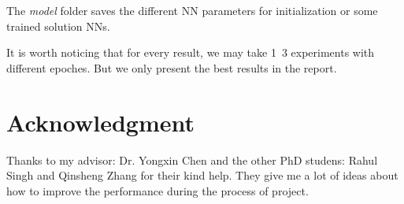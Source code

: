 \documentclass[conference,compsoc]{IEEEtran}
\begin{document}
The \textit{model} folder saves the different NN parameters for initialization or some trained solution NNs.

It is worth noticing that for every result, we may take 1~3 experiments with different epoches. But we only present the best results in the report. 



\section*{Acknowledgment}

Thanks to my advisor: Dr. Yongxin Chen and the other PhD studens: Rahul Singh and Qinsheng Zhang for their kind help. They give me a lot of ideas about how to improve the performance during the process of project.



\end{document}
